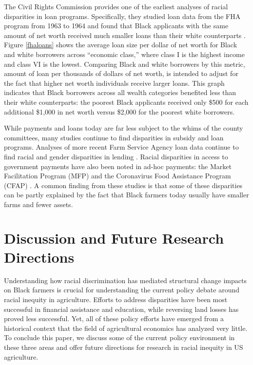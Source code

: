 \documentclass[12pt]{article}
\begin{document}
 The Civil Rights Commission provides one of the earliest analyses of racial disparities in loan programs. 
 Specifically, they studied loan data from the FHA program from 1963 to 1964 and found that Black applicants with the same amount of net worth received much smaller loans than their white counterparts \citep[pg. 71]{us_commission_on_civil_rights_equal_1965}. 
 Figure \ref{fhaloans} shows the average loan size per dollar of net worth for Black and white borrowers across “economic class,” where class I is the highest income and class VI is the lowest. 
 Comparing Black and white borrowers by this metric, amount of loan per thousands of dollars of net worth, is intended to adjust for the fact that higher net worth individuals receive larger loans. 
 This graph indicates that Black borrowers across all wealth categories benefited less than their white counterparts: the poorest Black applicants received only \$500 for each additional \$1,000 in net worth versus \$2,000 for the poorest white borrowers. 

While payments and loans today are far less subject to the whims of the county committees, many studies continue to find disparities in subsidy and loan programs.
Analyses of more recent Farm Service Agency loan data continue to find racial and gender disparities in lending \citep{escalante_credit_2006,ghimire_farm_2020,mishra_racial_2024,vekemans_loan_2024}. 
Racial disparities in access to government payments have also been noted in ad-hoc payments: the Market Facilitation Program (MFP) and the Coronavirus Food Assistance Program (CFAP) \citep{giri_analysis_2022,hendricks_explaining_2024,yu_understanding_2024}.
A common finding from these studies is that some of these disparities can be partly explained by the fact that Black farmers today usually have smaller farms and fewer assets.

\section*{Discussion and Future Research Directions}
Understanding how racial discrimination has mediated structural change impacts on Black farmers is crucial for understanding the current policy debate around racial inequity in agriculture.
Efforts to address disparities have been most successful in financial assistance and education, while reversing land losses has proved less successful. 
Yet, all of these policy efforts have emerged from a historical context that the field of agricultural economics has analyzed very little.
To conclude this paper, we discuss some of the current policy environment in these three areas and offer future directions for research in racial inequity in US agriculture.
\end{document}
